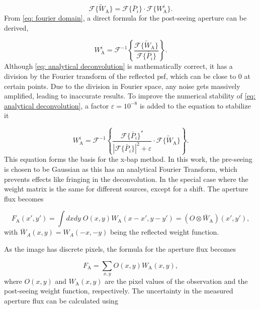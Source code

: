 \begin{equation}\label{eq: fourier domain}
    \mathcal{F}\{\tilde{W}_\mathrm{A}\}=\mathcal{F}\{\bar{P}_i\}\cdot\mathcal{F}\{W_\mathrm{A}^i\}.
\end{equation}
From \autoref{eq: fourier domain}, a direct formula for the post-seeing aperture can be derived,

\begin{equation}\label{eq: analytical deconvolution}
    W^i_\mathrm{A} = \mathcal{F}^{-1}\left\{\frac{\mathcal{F}\{\tilde{W}_\mathrm{A}\}}{\mathcal{F}\{\bar{P}_i\}}\right\}.
\end{equation}
Although \autoref{eq: analytical deconvolution} is mathematically correct, it has a division by the Fourier transform of the reflected \gls{psf}, which can be close to 0 at certain points. Due to the division in Fourier space, any noise gets massively amplified, leading to inaccurate results. 
To improve the numerical stability of \autoref{eq: analytical deconvolution}, a factor $\varepsilon=10^{-8}$ is added to the equation to stabilize it 

\begin{equation}\label{eq: numerical deconvolution}
    W^i_\mathrm{A} = \mathcal{F}^{-1}\left\{\frac{\mathcal{F}\{\bar{P}_i\}^*}{|\mathcal{F}\{\bar{P}_i\}|^2+\varepsilon}\cdot\mathcal{F}\{\tilde{W}_\mathrm{A}\}\right\}.
\end{equation}
This equation forms the basis for the \gls{x-bap} method. In this work, the pre-seeing is chosen to be Gaussian as this has an analytical Fourier Transform, which prevents effects like fringing in the deconvolution.
In the special case where the weight matrix is the same for different sources, except for a shift. The aperture flux becomes 

\begin{equation}
    F_\mathrm{A}(x',y') = \int dxdy\;O(x,y)W_\mathrm{A}(x-x',y-y') = (O \otimes \bar{W}_\mathrm{A})(x',y'),
\end{equation}
with $\bar{W}_A(x,y)=W_A(-x,-y)$ being the reflected weight function.

\noindent As the image has discrete pixels, the formula for the aperture flux becomes

\begin{equation}\label{eq: flux}
    F_\mathrm{A} = \sum_{x,y}O(x,y)W_\mathrm{A}(x,y),
\end{equation}
where $O(x,y)$ and $W_\mathrm{A}(x,y)$ are the pixel values of the observation and the post-seeing weight function, respectively. The uncertainty in the measured aperture flux can be calculated using

